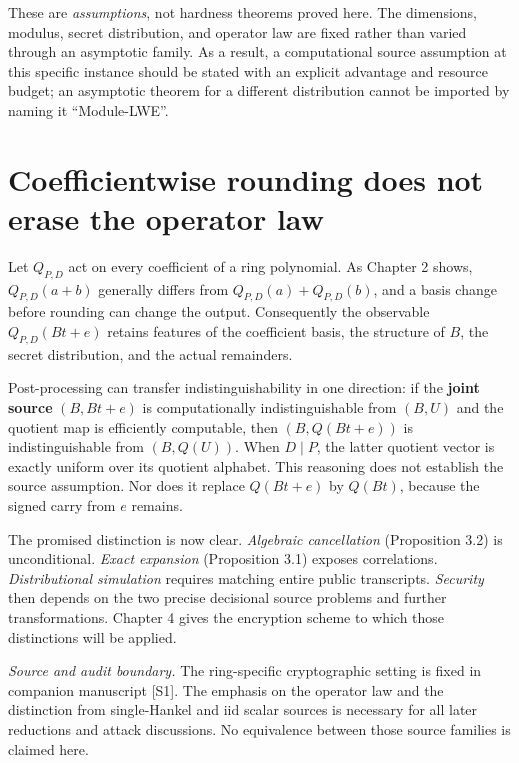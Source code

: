 \documentclass[
  11pt,
  a4paper,
  oneside]{report}
\begin{document}
These are \emph{assumptions}, not hardness theorems proved here. The
dimensions, modulus, secret distribution, and operator law are fixed
rather than varied through an asymptotic family. As a result, a
computational source assumption at this specific instance should be
stated with an explicit advantage and resource budget; an asymptotic
theorem for a different distribution cannot be imported by naming it
``Module-LWE''.

\section{Coefficientwise rounding does not erase the operator
law}\label{coefficientwise-rounding-does-not-erase-the-operator-law}

Let \(Q_{P,D}\) act on every coefficient of a ring polynomial. As
Chapter 2 shows, \(Q_{P,D}(a+b)\) generally differs from
\(Q_{P,D}(a)+Q_{P,D}(b)\), and a basis change before rounding can change
the output. Consequently the observable \(Q_{P,D}(Bt+e)\) retains
features of the coefficient basis, the structure of \(B\), the secret
distribution, and the actual remainders.

Post-processing can transfer indistinguishability in one direction: if
the \textbf{joint source} \((B,Bt+e)\) is computationally
indistinguishable from \((B,U)\) and the quotient map is efficiently
computable, then \((B,Q(Bt+e))\) is indistinguishable from \((B,Q(U))\).
When \(D\mid P\), the latter quotient vector is exactly uniform over its
quotient alphabet. This reasoning does not establish the source
assumption. Nor does it replace \(Q(Bt+e)\) by \(Q(Bt)\), because the
signed carry from \(e\) remains.

The promised distinction is now clear. \emph{Algebraic cancellation}
(Proposition 3.2) is unconditional. \emph{Exact expansion} (Proposition
3.1) exposes correlations. \emph{Distributional simulation} requires
matching entire public transcripts. \emph{Security} then depends on the
two precise decisional source problems and further transformations.
Chapter 4 gives the encryption scheme to which those distinctions will
be applied.

\emph{Source and audit boundary.} The ring-specific cryptographic
setting is fixed in companion manuscript {[}S1{]}. The emphasis on the
operator law and the distinction from single-Hankel and iid scalar
sources is necessary for all later reductions and attack discussions. No
equivalence between those source families is claimed here.
\end{document}
